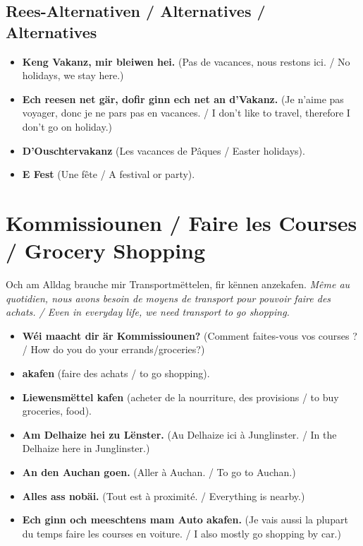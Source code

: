 \subsection{Rees-Alternativen / Alternatives / Alternatives}
\begin{itemize}
    \item \textbf{Keng Vakanz, mir bleiwen hei.} (Pas de vacances, nous restons ici. / No holidays, we stay here.)
    \item \textbf{Ech reesen net gär, dofir ginn ech net an d'Vakanz.} (Je n'aime pas voyager, donc je ne pars pas en vacances. / I don't like to travel, therefore I don't go on holiday.)
    \item \textbf{D'Ouschtervakanz} (Les vacances de Pâques / Easter holidays).
    \item \textbf{E Fest} (Une fête / A festival or party).
\end{itemize}

\vspace{1cm}

\section{Kommissiounen / Faire les Courses / Grocery Shopping}

Och am Alldag brauche mir Transportmëttelen, fir kënnen anzekafen. \textit{Même au quotidien, nous avons besoin de moyens de transport pour pouvoir faire des achats. / Even in everyday life, we need transport to go shopping.}

\begin{itemize}
    \item \textbf{Wéi maacht dir är Kommissiounen?} (Comment faites-vous vos courses ? / How do you do your errands/groceries?)
    \item \textbf{akafen} (faire des achats / to go shopping).
    \item \textbf{Liewensmëttel kafen} (acheter de la nourriture, des provisions / to buy groceries, food).
    \item \textbf{Am Delhaize hei zu Lënster.} (Au Delhaize ici à Junglinster. / In the Delhaize here in Junglinster.)
    \item \textbf{An den Auchan goen.} (Aller à Auchan. / To go to Auchan.)
    \item \textbf{Alles ass nobäi.} (Tout est à proximité. / Everything is nearby.)
    \item \textbf{Ech ginn och meeschtens mam Auto akafen.} (Je vais aussi la plupart du temps faire les courses en voiture. / I also mostly go shopping by car.)
\end{itemize}

